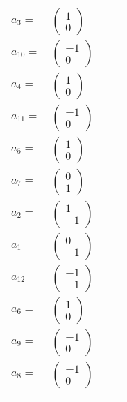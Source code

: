 \documentclass[1p]{elsarticle_modified}
\theoremstyle{definition}
\begin{document}
\begin{tabular}{m{7pt} m{180pt} m{7pt} m{180pt} }
\flushright $a_{3}=$&$\begin{pmatrix}1\\0\end{pmatrix}$ \\
\flushright $a_{10}=$&$\begin{pmatrix}-1\\0\end{pmatrix}$ \\
\flushright $a_{4}=$&$\begin{pmatrix}1\\0\end{pmatrix}$ \\
\flushright $a_{11}=$&$\begin{pmatrix}-1\\0\end{pmatrix}$ \\
\flushright $a_{5}=$&$\begin{pmatrix}1\\0\end{pmatrix}$ \\
\flushright $a_{7}=$&$\begin{pmatrix}0\\1\end{pmatrix}$ \\
\flushright $a_{2}=$&$\begin{pmatrix}1\\-1\end{pmatrix}$ \\
\flushright $a_{1}=$&$\begin{pmatrix}0\\-1\end{pmatrix}$ \\
\flushright $a_{12}=$&$\begin{pmatrix}-1\\-1\end{pmatrix}$ \\
\flushright $a_{6}=$&$\begin{pmatrix}1\\0\end{pmatrix}$ \\
\flushright $a_{9}=$&$\begin{pmatrix}-1\\0\end{pmatrix}$ \\
\flushright $a_{8}=$&$\begin{pmatrix}-1\\0\end{pmatrix}$\\&\end{tabular}
\end{document}
